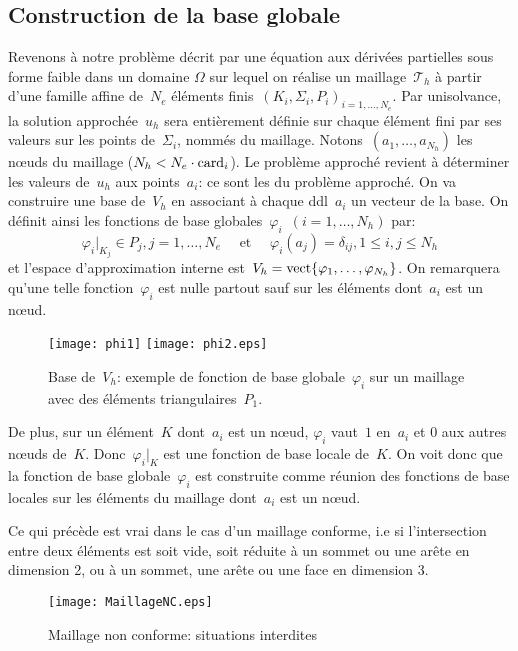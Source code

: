 \medskip
\subsection{Construction de la base globale}
Revenons à notre problème décrit par une équation aux dérivées partielles sous forme faible dans un domaine $\Omega$ sur lequel on réalise un maillage~$\mathcal{T}_h$ à partir d'une famille affine de~$N_e$ éléments finis~$(K_i, \Sigma_i, P_i)_{i=1,\ldots,N_e}$.
\medskip
Par unisolvance, la solution approchée~$u_h$ sera entièrement définie sur chaque élément fini par ses valeurs sur les points de~$\Sigma_i$, nommés  du maillage.
Notons~$(a_1,\ldots, a_{N_h})$ les nœuds du maillage ($N_h<N_e \cdot \mathrm{card}_i$).
Le problème approché revient à déterminer les valeurs de~$u_h$ aux points~$a_i$: ce sont les  du problème approché.
\medskip
On va construire une base de~$V_h$ en associant à chaque ddl~$a_i$ un vecteur de la base.
On définit ainsi les fonctions de base globales~$\varphi_i$~$(i = 1,\ldots, N_h)$ par:
\begin{equation}\varphi_i|_{K_j} \in P_j, j = 1,\ldots, N_e \quad \text{ et }\quad \varphi_i(a_j) = \delta_{ij}, 1\le i,j\le N_h\end{equation}
et l'espace d'approximation interne est~$V_h=\operatorname{vect}\{\varphi_1,\ldots, \varphi_{N_h}\}$.
On remarquera qu'une telle fonction~$\varphi_i$ est nulle partout sauf sur les éléments
dont~$a_i$ est un nœud.
\begin{figure}[h!]
\centering
\texttt{[image: phi1]} \hspace{5em} \texttt{[image: phi2.eps]}
\caption{\label{BaseVh} Base de~$V_h$: exemple de fonction de base globale~$\varphi_i$ sur un maillage avec des éléments triangulaires~$P_1$.}
\end{figure}

\medskip
De plus, sur un élément~$K$ dont~$a_i$ est un nœud, $\varphi_i$ vaut~$1$ en~$a_i$ et $0$ aux autres nœuds de~$K$. Donc~$\varphi_i|_K$ est une fonction de base locale de~$K$.
On voit donc que la fonction de base globale~$\varphi_i$ est construite comme réunion des fonctions de base locales sur les éléments du maillage dont~$a_i$ est un nœud.

\medskip
\begin{remarque} Ce qui précède est vrai dans le cas d'un maillage conforme, i.e si l'intersection entre deux éléments est soit vide, soit réduite à un sommet ou une arête en dimension 2, ou à un sommet, une arête ou une face en dimension 3.\end{remarque}
\begin{figure}[h!]
\centering
\texttt{[image: MaillageNC.eps]}
\caption{Maillage non conforme: situations interdites}\label{maillageNC}
\end{figure}

